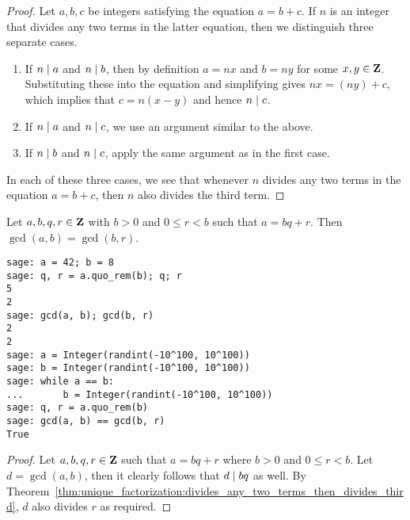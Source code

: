 \begin{proof}
Let $a,b,c$ be integers satisfying the equation $a = b + c$. If
$n$ is an integer that divides any two terms in the latter equation, then
we distinguish three separate cases.
%
\begin{enumerate}
\item If $n \;|\; a$ and $n \;|\; b$, then by definition $a = nx$ and
  $b = ny$ for some $x,y \in \mathbf{Z}$. Substituting these into the
  equation and simplifying gives $nx = (ny) + c$, which implies that
  $c = n(x - y)$ and hence $n \;|\; c$.

\item If $n \;|\; a$ and $n \;|\; c$, we use an argument similar to
  the above.

\item If $n \;|\; b$ and $n \;|\; c$, apply the same argument as in
  the first case.
\end{enumerate}
%
In each of these three cases, we see that whenever $n$ divides any
two terms in the equation $a = b + c$, then $n$ also divides the
third term.
\end{proof}

\begin{lemma}
\label{lem:unique_factorization:gcd(a,b)_eq_gcd(b,r)}
Let $a,b,q,r \in \mathbf{Z}$ with $b > 0$ and $0 \leq r < b$ such that
$a = bq + r$. Then $\gcd(a,b) = \gcd(b,r)$.
\end{lemma}

\begin{lstlisting}
sage: a = 42; b = 8
sage: q, r = a.quo_rem(b); q; r
5
2
sage: gcd(a, b); gcd(b, r)
2
2
sage: a = Integer(randint(-10^100, 10^100))
sage: b = Integer(randint(-10^100, 10^100))
sage: while a == b:
...       b = Integer(randint(-10^100, 10^100))
sage: q, r = a.quo_rem(b)
sage: gcd(a, b) == gcd(b, r)
True
\end{lstlisting}

\begin{proof}
Let $a,b,q,r \in \mathbf{Z}$ such that $a = bq + r$ where $b > 0$ and
$0 \leq r < b$. Let $d = \gcd(a,b)$, then it clearly follows that
$d \;|\; bq$ as well. By
Theorem~\ref{thm:unique_factorization:divides_any_two_terms_then_divides_third},
$d$ also divides $r$ as required.
\end{proof}

